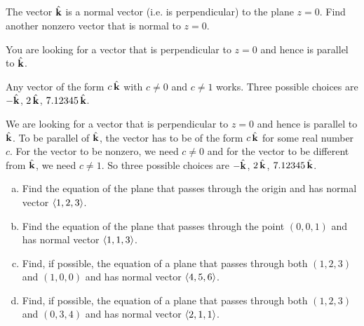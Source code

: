 


\subsection*{\Conceptual}

\begin{question}
The vector $\hat{\mathbf{k}}$ is a normal vector (i.e. is perpendicular) to the plane $z=0$. 
Find another nonzero vector that is normal to $z=0$.
\end{question}

\begin{hint}
You are looking for a vector that is perpendicular to $z=0$ and hence is
parallel to $\hat{\mathbf{k}}$. 
\end{hint}

\begin{answer}
Any vector of the form $c\,\hat{\mathbf{k}}$ with $c\ne 0$ and $c\ne 1$ works.
Three possible choices are $-\hat{\mathbf{k}}$, $2\,\hat{\mathbf{k}}$, $7.12345\,\hat{\mathbf{k}}$.
\end{answer}

\begin{solution}
We are looking for a vector that is perpendicular to $z=0$ and hence is
parallel to $\hat{\mathbf{k}}$. To be parallel of $\hat{\mathbf{k}}$, the vector has to be of the form $c\,\hat{\mathbf{k}}$ for some real number $c$.  For the vector to be nonzero, we need $c\ne 0$ and for the vector to be different from $\hat{\mathbf{k}}$, we need $c\ne 1$. So
three possible choices are $-\hat{\mathbf{k}}$, $2\,\hat{\mathbf{k}}$, $7.12345\,\hat{\mathbf{k}}$.
\end{solution}

\begin{question}
\begin{enumerate}[(a)]
\item
Find the equation of the plane that passes through the origin and has normal vector $\left< 1,2,3\right>$.
\item
Find the equation of the plane that passes through the point $(0,0,1)$ and has normal vector $\left< 1,1,3\right>$.
\item
Find, if possible, the equation of a plane that passes through both $(1,2,3)$
and $(1,0,0)$ and has normal vector $\left< 4,5,6\right>$.
\item
Find, if possible, the equation of a plane that passes through both $(1,2,3)$
and $(0,3,4)$ and has normal vector $\left< 2,1,1\right>$.
\end{enumerate}
\end{question}

